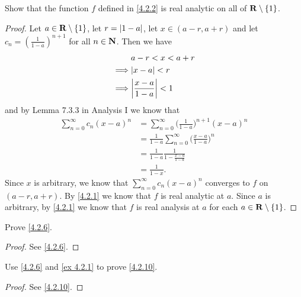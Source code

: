 \begin{exercise}\label{ex 4.2.2}
  Show that the function \(f\) defined in \cref{4.2.2} is real analytic on all of \(\mathbf{R} \setminus \{1\}\).
\end{exercise}

\begin{proof}
  Let \(a \in \mathbf{R} \setminus \{1\}\), let \(r = \left\lvert1 - a\right\rvert\), let \(x \in (a - r, a + r)\) and let \(c_n = (\frac{1}{1 - a})^{n + 1}\) for all \(n \in \mathbf{N}\).
  Then we have
  \begin{align*}
             & a - r < x < a + r             \\
    \implies & \abs{x - a} < r               \\
    \implies & \abs{\frac{x - a}{1 - a}} < 1
  \end{align*}
  and by Lemma 7.3.3 in Analysis I we know that
  \begin{align*}
    \sum_{n = 0}^\infty c_n (x - a)^n & = \sum_{n = 0}^\infty \bigg(\frac{1}{1 - a}\bigg)^{n + 1} (x - a)^n     \\
                                      & = \frac{1}{1 - a} \sum_{n = 0}^\infty \bigg(\frac{x - a}{1 - a}\bigg)^n \\
                                      & = \frac{1}{1 - a} \frac{1}{1 - \frac{x - a}{1 - a}}                     \\
                                      & = \frac{1}{1 - x}.
  \end{align*}
  Since \(x\) is arbitrary, we know that \(\sum_{n = 0}^\infty c_n (x - a)^n\) converges to \(f\) on \((a - r, a + r)\).
  By \cref{4.2.1} we know that \(f\) is real analytic at \(a\).
  Since \(a\) is arbitrary, by \cref{4.2.1} we know that \(f\) is real analysis at \(a\) for each \(a \in \mathbf{R} \setminus \{1\}\).
\end{proof}

\begin{exercise}\label{ex 4.2.3}
  Prove \cref{4.2.6}.
\end{exercise}

\begin{proof}
  See \cref{4.2.6}.
\end{proof}

\begin{exercise}\label{ex 4.2.4}
  Use \cref{4.2.6} and \cref{ex 4.2.1} to prove \cref{4.2.10}.
\end{exercise}

\begin{proof}
  See \cref{4.2.10}.
\end{proof}

